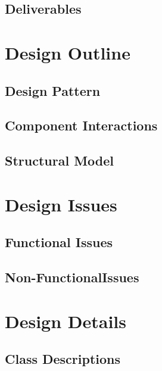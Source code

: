 \documentclass[12pt]{article}
\begin{document}
\subsection{Deliverables}




\section{Design Outline}

\subsection{Design Pattern}


\subsection{Component Interactions}


\subsection{Structural Model}




\section{Design Issues}

\subsection{Functional Issues}


\subsection{Non-FunctionalIssues}




\section{Design Details}

\subsection{Class Descriptions}

\end{document}
